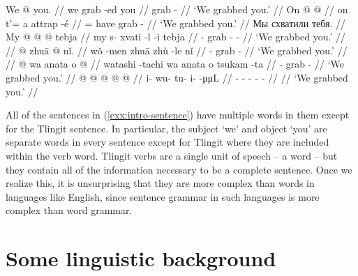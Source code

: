 \pex\label{exx:intro-sentence}%
\a\label{ex:intro-sentence-english}%
%
\begingl
	\gla	We  @ {} you. //
	\glb	we grab -ed you //
	\glc	{} grab -  //
	\glft	‘We grabbed you.’
		//
\endgl
\a\label{ex:intro-sentence-french}%
%
\begingl
	\gla	On  @ {}  @ {} //
	\glb	on t’= a  attrap -é //
	\glc	{} = have grab - //
	\glft	‘We grabbed you.’
		//
\endgl
\a\label{ex:intro-sentence-russian}%
%
\begingl
	\glpreamble	Мы схватили тебя. //
	\gla	My  @ {} @ {} @ {} tebja //
	\glb	my s- xvati -l -i tebja //
	\glc	{} - grab - -  //
	\glft	‘We grabbed you.’
		//
\endgl
\a\label{ex:intro-sentence-mandarin}%
%
\begingl
	 //
	\gla	{} @ {} zhuā  @ {} nǐ. //
	\glb	wǒ -men zhuā zhù -le nǐ //
	\glc	{} - grab  -  //
	\glft	‘We grabbed you.’
		//
\endgl
\a\label{ex:intro-sentence-japanese}%
%
\begingl
	 //
	\gla	{} @ {} wa anata o  @ {} //
	\glb	watashi -tachi wa anata o tsukam -ta //
	\glc	{} -    grab - //
	\glft	‘We grabbed you.’
		//
\endgl
\a\label{ex:intro-sentence-tlingit}%
%
\begingl
	\gla	{} @ {} @ {} @ {} @ {} @ {} //
	\glb	i- wu- tu- i-  -μμL //
	\glc	{}- - - -  - //
	\gld	{} {} {} {} {} {} //
	\glft	‘We grabbed you.’
		//
\endgl
\xe

All of the sentences in (\ref{exx:intro-sentence}) have multiple words in them except for the Tlingit sentence. In particular, the subject ‘we’ and object ‘you’ are separate words in every sentence except for Tlingit where they are included within the verb word. Tlingit verbs are a single unit of speech – a word – but they contain all of the information necessary to be a complete sentence. Once we realize this, it is unsurprising that they are more complex than words in languages like English, since sentence grammar in such languages is more complex than word grammar.

\section{Some linguistic background}\label{sec:intro-ling}

